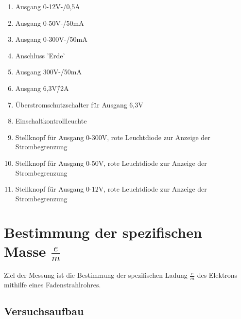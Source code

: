 \documentclass[12pt,a4paper]{article}
\begin{document}
\begin{enumerate}
\item	Ausgang 0-12V-/0,5A

\item	Ausgang 0-50V-/50mA

\item	Ausgang 0-300V-/50mA

\item	Anschluss 'Erde'

\item	Ausgang 300V-/50mA

\item	Ausgang 6,3V\~/2A

\item	Überstromschutzschalter für Ausgang 6,3V

\item	Einschaltkontrollleuchte

\item	Stellknopf für Ausgang 0-300V, rote Leuchtdiode zur Anzeige der Strombegrenzung

\item	Stellknopf für Ausgang 0-50V, rote Leuchtdiode zur Anzeige der Strombegrenzung

\item	Stellknopf für Ausgang 0-12V, rote Leuchtdiode zur Anzeige der Strombegrenzung
\end{enumerate}

\section{Bestimmung der spezifischen Masse $\frac{e}{m}$}
Ziel der Messung ist die Bestimmung der spezifischen Ladung $\frac{e}{m}$ des Elektrons mithilfe eines Fadenstrahlrohres.

\subsection{Versuchsaufbau}
\end{document}
